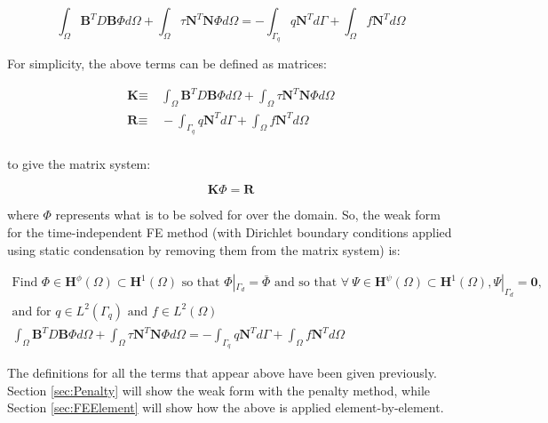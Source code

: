 \documentclass[10pt]{article}
\begin{document}
\begin{equation}
\int_{\Omega}\textbf{B}^TD\textbf{B}\Phi d\Omega+\int_{\Omega}\tau \textbf{N}^T\textbf{N}\Phi d\Omega=-\int_{\Gamma_q}q\textbf{N}^Td\Gamma+\int_{\Omega}f\textbf{N}^Td\Omega
\end{equation}

For simplicity, the above terms can be defined as matrices:

\begin{equation}
\label{eq:FEWeakForm}
\begin{aligned}
\textbf{K}\equiv&\ \int_{\Omega}\textbf{B}^TD\textbf{B}\Phi d\Omega+\int_{\Omega}\tau \textbf{N}^T\textbf{N}\Phi d\Omega\\
\textbf{R}\equiv&\ -\int_{\Gamma_q}q\textbf{N}^Td\Gamma+\int_{\Omega}f\textbf{N}^Td\Omega\\
\end{aligned}
\end{equation}

to give the matrix system:

\begin{equation}
\textbf{K}\Phi=\textbf{R}
\end{equation}

where \(\Phi\) represents what is to be solved for over the domain. So, the weak form for the time-independent FE method (with Dirichlet boundary conditions applied using static condensation by removing them from the matrix system) is:

\begin{tcolorbox}
\begin{equation}
\label{eq:FEWeakFormFinal}
\begin{aligned}
\text{Find }\Phi\in \textbf{H}^\phi(\Omega)\subset \textbf{H}^1(\Omega) \text{ so that } \Phi|_{\Gamma_d}=\bar{\Phi} \text{ and so that }\forall\ \Psi \in \textbf{H}^\psi(\Omega)\subset \textbf{H}^1(\Omega), \Psi|_{\Gamma_d}=\textbf{0},\\
\text{and for }q\in L^2(\Gamma_q)\text{ and }f\in L^2(\Omega)\\
\int_{\Omega}\textbf{B}^TD\textbf{B}\Phi d\Omega+\int_{\Omega}\tau \textbf{N}^T\textbf{N}\Phi d\Omega=-\int_{\Gamma_q}q\textbf{N}^Td\Gamma+\int_{\Omega}f\textbf{N}^Td\Omega
\end{aligned}
\end{equation}
\end{tcolorbox}

The definitions for all the terms that appear above have been given previously. Section \ref{sec:Penalty} will show the weak form with the penalty method, while Section \ref{sec:FEElement} will show how the above is applied element-by-element.
\end{document}
